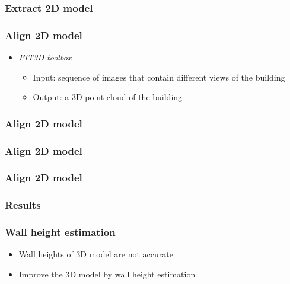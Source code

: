 \documentclass{beamer}
\begin{document}
\frame
{
	\frametitle{Extract 2D model}
}

\frame
{
	\frametitle{Align 2D model}
	\begin{itemize}
	\item  <+-| alert@+> \emph{FIT3D toolbox}
		\begin{itemize}
		\item  <+-| alert@+> Input: sequence of images that contain different views of the building
		\item  <+-| alert@+> Output: a 3D point cloud of the building
		\end{itemize}
	\end{itemize}
}


\frame
{
	\frametitle{Align 2D model}
}


\frame
{
	\frametitle{Align 2D model}
}


\frame
{
	\frametitle{Align 2D model}
}

\frame
{
	\frametitle{Results}
}

\frame
{
	\frametitle{Wall height estimation}
	\begin{itemize}
	\item  <+-| alert@+> Wall heights of 3D model are not accurate
	\item  <+-| alert@+> Improve the 3D model by wall height estimation
	\end{itemize}
}
\end{document}
